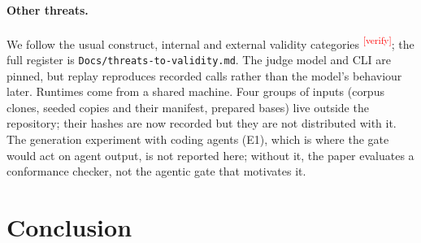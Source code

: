 \documentclass[10pt,a4paper]{article}
\newcommand{\citeneeded}[1]{\cite{#1}\textsuperscript{\textcolor{red}{\tiny[verify]}}}
\begin{document}
\paragraph{Other threats.}
We follow the usual construct, internal and external validity categories \citeneeded{wohlin2012experimentation}; the
full register is \texttt{Docs/threats-to-validity.md}.
The judge model and CLI are pinned, but replay reproduces recorded calls rather than the model's behaviour later.
Runtimes come from a shared machine. Four groups of inputs (corpus clones, seeded copies and their manifest, prepared
bases) live outside the repository; their hashes are now recorded but they are not distributed with it.
The generation experiment with coding agents (E1), which is where the gate would act on agent output, is not
reported here; without it, the paper evaluates a conformance checker, not the agentic gate that motivates it.

\section{Conclusion}\label{sec:conclusion}
\end{document}
